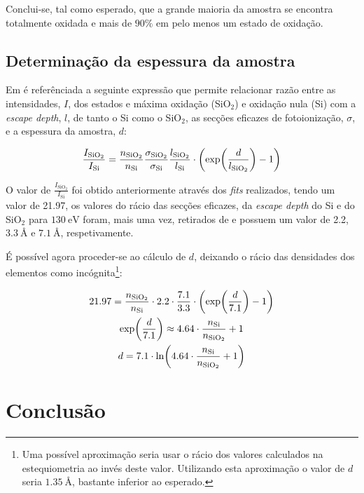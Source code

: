 \documentclass[baaa]{baaa}
\begin{document}
Conclui-se, tal como esperado, que a grande maioria da amostra se encontra totalmente oxidada e mais de $90\%$ em pelo menos um estado de oxidação.

\subsection{Determinação da espessura da amostra}

Em \cite{Himpsel} é referênciada a seguinte expressão que permite relacionar razão entre as intensidades, $I$, dos estados e máxima oxidação (SiO$_2$) e oxidação nula (Si) com a \textit{escape depth}, $l$, de tanto o Si como o SiO$_2$, as secções eficazes de fotoionização, $\sigma$, e a espessura da amostra, $d$:

\begin{gather}
  \frac{I_{\text{SiO}_2}}{I_{\text{Si}}}=\frac{n_{\text{SiO}_2}}{n_{\text{Si}}}\frac{\sigma_{\text{SiO}_2}}{\sigma_{\text{Si}}}\frac{l_{\text{SiO}_2}}{l_{\text{Si}}}\cdot \qty(\exp(\frac{d}{l_{\text{SiO}_2}})-1)
\end{gather}

O valor de $\frac{I_{\text{SiO}_2}}{I_{\text{Si}}}$ foi obtido anteriormente através dos \textit{fits} realizados, tendo um valor de 21.97, os valores do rácio das secções eficazes, da \textit{escape depth} do Si e do SiO$_2$ para $130\ \si{\electronvolt}$ foram, mais uma vez, retirados de \cite{Himpsel} e possuem um valor de 2.2, $3.3\ \si{\angstrom}$ e $7.1\ \si{\angstrom}$, respetivamente.

É possível agora proceder-se ao cálculo de $d$, deixando o rácio das densidades dos elementos como incógnita\footnote{Uma possível aproximação seria usar o rácio dos valores calculados na estequiometria ao invés deste valor. Utilizando esta aproximação o valor de $d$ seria $1.35\ \si{\angstrom}$, bastante inferior ao esperado.}:

\begin{gather}
  21.97=\frac{n_{\text{SiO}_2}}{n_{\text{Si}}}\cdot 2.2\cdot\frac{7.1}{3.3}\cdot \qty(\exp(\frac{d}{7.1})-1)\\
  \exp(\frac{d}{7.1})\approx 4.64\cdot\frac{n_{\text{Si}}}{n_{\text{SiO}_2}}+1\\
  d=7.1\cdot\ln( 4.64\cdot\frac{n_{\text{Si}}}{n_{\text{SiO}_2}}+1)
\end{gather}


\section{Conclusão}
\end{document}
